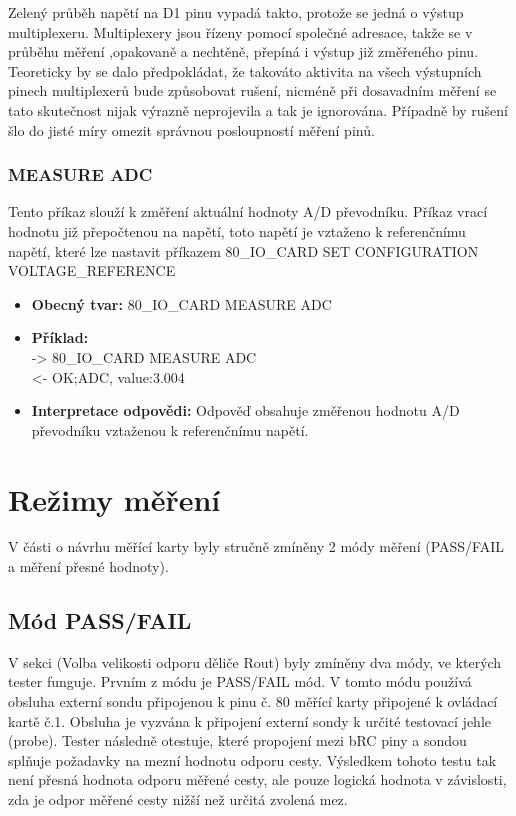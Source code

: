 Zelený průběh napětí na D1 pinu vypadá takto, protože se jedná o výstup multiplexeru. Multiplexery jsou řízeny pomocí společné adresace, takže
se v průběhu měření ,opakovaně a nechtěně, přepíná i výstup již změřeného pinu. Teoreticky by se dalo předpokládat, že takováto aktivita na všech
výstupních pinech multiplexerů bude způsobovat rušení, nicméně při dosavadním měření se tato skutečnost nijak výrazně neprojevila a tak je ignorována.
Případně by rušení šlo do jisté míry omezit správnou posloupností měření pinů.

\subsubsection{MEASURE ADC}
Tento příkaz slouží k změření aktuální hodnoty A/D převodníku. Příkaz vrací hodnotu již přepočtenou na napětí, toto napětí je vztaženo k referenčnímu napětí,
které lze nastavit příkazem 80\_IO\_CARD SET CONFIGURATION VOLTAGE\_REFERENCE

\begin{itemize}[leftmargin=*]
    \item \textbf{Obecný tvar:} 80\_IO\_CARD MEASURE ADC
    \item \textbf{Příklad:}\\
    -> 80\_IO\_CARD MEASURE ADC\\
    <- OK;ADC, value:3.004\\
    \item \textbf{Interpretace odpovědi:} Odpověď obsahuje změřenou hodnotu A/D převodníku vztaženou k referenčnímu napětí.
\end{itemize}

\section{Režimy měření}
V části o návrhu měřící karty byly stručně zmíněny 2 módy měření (PASS/FAIL a měření přesné hodnoty).

\subsection{Mód PASS/FAIL}
V sekci (Volba velikosti odporu děliče Rout) byly zmíněny dva módy, ve kterých tester funguje.
Prvním z módu je PASS/FAIL mód. V tomto módu používá obsluha externí sondu připojenou k pinu č. 80
měřící karty připojené k ovládací kartě č.1. Obsluha je vyzvána k připojení externí sondy k 
určité testovací jehle (probe). Tester následně otestuje, které propojení mezi bRC piny a sondou splňuje požadavky
na mezní hodnotu odporu cesty. Výsledkem tohoto testu tak není přesná hodnota odporu měřené cesty,
ale pouze logická hodnota v závislosti, zda je odpor měřené cesty nižší než určitá zvolená mez.\\


